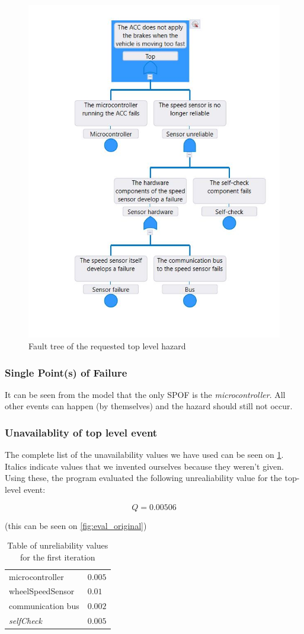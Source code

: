 \documentclass[a4paper]{article}
\begin{document}
\begin{figure}
	\centering
	\includegraphics[width=.5\textwidth]{fault_tree_original.jpg}
	\caption{Fault tree of the requested top level hazard}%
	\label{fig:fault_tree_original}
\end{figure}

\subsubsection{Single Point(s) of Failure}

It can be seen from the model that the only \gls{SPOF} is the
\emph{microcontroller}. All other events can happen (by themselves) and the
hazard should still not occur.

\pagebreak
\subsubsection{Unavailablity of top level event}

The complete list of the unavailability values we have used can be seen on
\cref{tab:unreliability_original}. Italics indicate values that we invented
ourselves because they weren't given. Using these, the program evaluated the
following unrealiability value for the top-level event:

\[ Q = 0.00506 \]

(this can be seen on \cref{fig:eval_original})

\begin{table}
	\centering
	\begin{tabular}{ll}
		\toprule
		microcontroller          & \(0.005\) \\
		\gls{wheelSpeedSensor}   & \(0.01\)  \\
		communication bus        & \(0.002\) \\
		\textit{\gls{selfCheck}} & \(0.005\) \\
		\bottomrule
	\end{tabular}
	\caption{Table of unreliability values for the first iteration}%
	\label{tab:unreliability_original}
\end{table}
\end{document}
